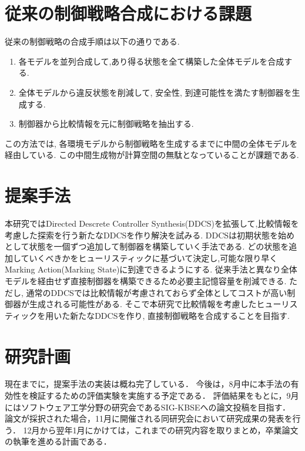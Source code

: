 \documentclass[11pt]{jarticle}
\begin{document}

\section{従来の制御戦略合成における課題}
従来の制御戦略の合成手順\cite{eze}は以下の通りである.
\begin{enumerate}
    \item 各モデルを並列合成して,あり得る状態を全て構築した全体モデルを合成する.
    \item 全体モデルから違反状態を削減して, 安全性, 到達可能性を満たす制御器を生成する.
    \item 制御器から比較情報を元に制御戦略を抽出する.
\end{enumerate}
この方法では, 各環境モデルから制御戦略を生成するまでに中間の全体モデルを経由している. この中間生成物が計算空間の無駄となっていることが課題である.


\section{提案手法}
本研究ではDirected Descrete Controller Synthesis(DDCS)\cite{ddcs}を拡張して,比較情報を考慮した探索を行う新たなDDCSを作り解決を試みる.
DDCSは初期状態を始めとして状態を一個ずつ追加して制御器を構築していく手法である. どの状態を追加していくべきかをヒューリスティックに基づいて決定し,可能な限り早くMarking Action(Marking State)に到達できるようにする. 従来手法と異なり全体モデルを経由せず直接制御器を構築できるため必要主記憶容量を削減できる. ただし, 通常のDDCSでは比較情報が考慮されておらず全体としてコストが高い制御器が生成される可能性がある. そこで本研究で比較情報を考慮したヒューリスティックを用いた新たなDDCSを作り, 直接制御戦略を合成することを目指す.


\section{研究計画}
現在までに，提案手法の実装は概ね完了している．
今後は，8月中に本手法の有効性を検証するための評価実験を実施する予定である．
評価結果をもとに，9月にはソフトウェア工学分野の研究会であるSIG-KBSEへの論文投稿を目指す．
論文が採択された場合，11月に開催される同研究会において研究成果の発表を行う．
12月から翌年1月にかけては，これまでの研究内容を取りまとめ，卒業論文の執筆を進める計画である．
\end{document}
